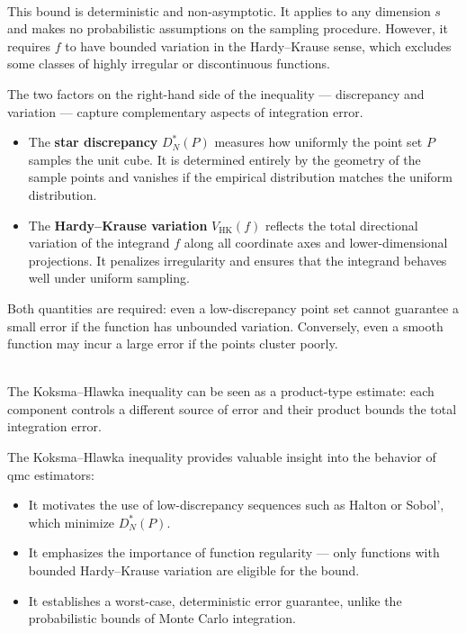\begin{remark} \ \\
This bound is deterministic and non-asymptotic. It applies to any dimension $s$
and makes no probabilistic assumptions on the sampling procedure. However, it
requires $f$ to have bounded variation in the Hardy--Krause sense, which
excludes some classes of highly irregular or discontinuous functions.
\end{remark}

The two factors on the right-hand side of the inequality --- discrepancy and
variation --- capture complementary aspects of integration error.

\begin{itemize}
    \item The \textbf{star discrepancy} $D_N^*(P)$ measures how uniformly the
    point set $P$ samples the unit cube. It is determined entirely by the
    geometry of the sample points and vanishes if the empirical distribution
    matches the uniform distribution.
    \item The \textbf{Hardy--Krause variation} $V_{\mathrm{HK}}(f)$ reflects the
    total directional variation of the integrand $f$ along all coordinate axes
    and lower-dimensional projections. It penalizes irregularity and ensures
    that the integrand behaves well under uniform sampling.
\end{itemize}

Both quantities are required: even a low-discrepancy point set cannot guarantee
a small error if the function has unbounded variation. Conversely, even a smooth
function may incur a large error if the points cluster poorly.

\begin{remark} \ \\
The Koksma--Hlawka inequality can be seen as a product-type estimate: each
component controls a different source of error and their product bounds the
total integration error.
\end{remark}

The Koksma--Hlawka inequality provides valuable insight into the behavior of
\acl{qmc} estimators:

\begin{itemize}
    \item It motivates the use of low-discrepancy sequences such as Halton or
    Sobol', which minimize $D_N^*(P)$.
    \item It emphasizes the importance of function regularity --- only functions
    with bounded Hardy--Krause variation are eligible for the bound.
    \item It establishes a worst-case, deterministic error guarantee, unlike the
    probabilistic bounds of Monte Carlo integration.
\end{itemize}

